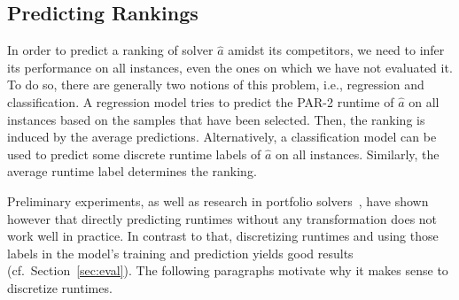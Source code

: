 \documentclass[runningheads]{llncs}
\begin{document}
\subsection{Predicting Rankings}
\label{sec:main1}
In order to predict a ranking of solver $\hat{a}$ amidst its competitors, we need to infer its performance on all instances, even the ones on which we have not evaluated it.
To do so, there are generally two notions of this problem, i.e., regression and classification.
A regression model tries to predict the \mbox{PAR-2} runtime of $\hat{a}$ on all instances based on the samples that have been selected.
Then, the ranking is induced by the average predictions.
Alternatively, a classification model can be used to predict some discrete runtime labels of $\hat{a}$ on all instances.
Similarly, the average runtime label determines the ranking.

Preliminary experiments, as well as research in portfolio solvers~\cite{NgokoCT19,CollauttiMMO13}, have shown however that directly predicting runtimes without any transformation does not work well in practice.
In contrast to that, discretizing runtimes and using those labels in the model's training and prediction yields good results (cf.~Section~\ref{sec:eval}).
The following paragraphs motivate why it makes sense to discretize runtimes.
\end{document}
